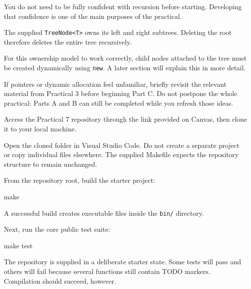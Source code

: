 \documentclass{csc2059practical}
\begin{document}
You do not need to be fully confident with recursion before starting. Developing
that confidence is one of the main purposes of the practical.

\begin{importantnote}
The supplied \texttt{TreeNode<T>} owns its left and right subtrees.
Deleting the root therefore deletes the entire tree recursively.

For this ownership model to work correctly, child nodes attached to the tree
must be created dynamically using \texttt{new}. A later section will
explain this in more detail.
\end{importantnote}

\begin{tipbox}
If pointers or dynamic allocation feel unfamiliar, briefly revisit the relevant
material from Practical 3 before beginning Part C. Do not postpone the whole
practical: Parts A and B can still be completed while you refresh those ideas.
\end{tipbox}



Access the Practical 7 repository through the link provided on Canvas, then
clone it to your local machine.

Open the cloned folder in Visual Studio Code. Do not create a separate project
or copy individual files elsewhere. The supplied Makefile expects the repository
structure to remain unchanged.

From the repository root, build the starter project:

\begin{terminal}
make
\end{terminal}

A successful build creates executable files inside the \texttt{bin/}
directory.

Next, run the core public test suite:

\begin{terminal}
make test
\end{terminal}

The repository is supplied in a deliberate starter state. Some tests will pass
and others will fail because several functions still contain TODO markers.
Compilation should succeed, however.
\end{document}

